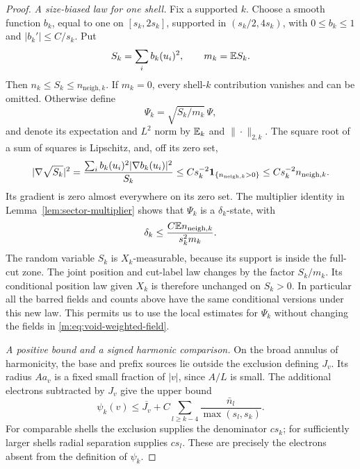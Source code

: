 \begin{proof}
\medskip\noindent
\emph{A size-biased law for one shell.}
Fix a supported $k$.  Choose a smooth function $b_k$, equal to one on
$[s_k,2s_k]$, supported in $(s_k/2,4s_k)$, with
$0\le b_k\le1$ and $|b_k'|\le C/s_k$.  Put
\[
 S_k=\sum_i b_k(u_i)^2,\qquad m_k=\mathbb E S_k.
\]
Then $n_k\le S_k\le n_{\mathrm{neigh},k}$.  If $m_k=0$, every
shell-$k$ contribution vanishes and can be omitted.  Otherwise define
\[
 \Psi_k=\sqrt{S_k/m_k}\,\Psi,
\]
and denote its expectation and $L^2$ norm by $\mathbb E_k$ and $\|\cdot\|_{2,k}$.
The square root of a sum of squares is Lipschitz, and, off its zero set,
\[
 |\nabla\sqrt{S_k}|^2
 =\frac{\sum_i b_k(u_i)^2|\nabla b_k(u_i)|^2}{S_k}
 \le Cs_k^{-2}\mathbf 1_{\{n_{\mathrm{neigh},k}>0\}}
 \le Cs_k^{-2}n_{\mathrm{neigh},k}.
\]
Its gradient is zero almost everywhere on its zero set.  The multiplier
identity in Lemma~\ref{lem:sector-multiplier} shows that $\Psi_k$ is a
$\delta_k$-state, with
\begin{equation}\label{m:eq:void-tilt-energy}
 \delta_k\le
 \frac{C\mathbb E n_{\mathrm{neigh},k}}{s_k^2m_k}.
\end{equation}
The random variable $S_k$ is $X_k$-measurable, because its support is
inside the full-cut zone.  The joint position and cut-label law changes
by the factor $S_k/m_k$.  Its conditional position law given $X_k$ is
therefore unchanged on $S_k>0$.  In particular all the barred fields and
counts above have the same conditional versions under this new law.
This permits us to use the local estimates for $\Psi_k$ without changing
the fields in \eqref{m:eq:void-weighted-field}.

\medskip\noindent
\emph{A positive bound and a signed harmonic comparison.}
On the broad annulus of harmonicity, the base and prefix sources lie
outside the exclusion defining $J_v$.  Its radius $Aa_v$ is a fixed
small fraction of $|v|$, since $A/L$ is small.  The additional electrons
subtracted by $J_v$ give the upper bound
\begin{equation}\label{m:eq:void-positive-comparison}
 \psi_k(v)\le\overline{J_v}
       +C\sum_{l\ge k-4}\frac{\bar n_l}{\max(s_l,s_k)}.
\end{equation}
For comparable shells the exclusion supplies the denominator
$c s_k$; for sufficiently larger shells radial separation supplies
$c s_l$.  These are precisely the electrons absent from the definition
of $\psi_k$.


\end{proof}
